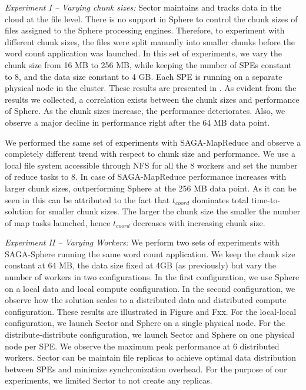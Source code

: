 \documentclass[3p,twocolumn]{elsarticle}
\begin{document}
{\it Experiment I -- Varying chunk sizes:} Sector maintains and tracks
data in the cloud at the file level. There is no support in Sphere to
control the chunk sizes of files assigned to the Sphere processing
engines. Therefore, to experiment with different chunk sizes, the
files were split manually into smaller chunks before the word count
application was launched. In this set of experiments, we vary the
chunk size from 16 MB to 256 MB, while keeping the number of SPEs
constant to 8, and the data size constant to 4 GB. Each SPE is running
on a separate physical node in the cluster. These results are
presented in . As evident from the results we collected, a
correlation exists between the chunk sizes and performance of Sphere.
As the chunk sizes increase, the performance deteriorates. Also, we
observe a major decline in performance right after the 64 MB data
point. 

We performed the same set of experiments with
SAGA-MapReduce and observe a completely different trend with respect
to chunk size and performance. We use a local file system accessible
through NFS for all the 8 workers and set the number of reduce tasks to 8.
In case of SAGA-MapReduce performance increases with larger chunk sizes,
outperforming Sphere at the 256 MB data point. As it can be seen in 
this can be attributed to the fact that $t_{coord}$ dominates total
time-to-solution for smaller chunk sizes. The larger the chunk size the
smaller the number of map tasks launched, hence $t_{coord}$ decreases with
increasing chunk size.


{\it Experiment II -- Varying Workers:} We perform two sets of
experiments with SAGA-Sphere running the same word count application.
We keep the chunk size constant at 64 MB, the
data size fixed at 4GB (as previously) but vary the number of
workers in two configurations. In the first configuration, we use Sphere 
on a local data and local compute configuration. In the second configuration, we 
observe how the solution scales to a distributed data and distributed compute
configuration. These results are illustrated in Figure  and F{xx}.  For
the local-local configuration, we launch Sector and Sphere on a single
physical node. For the distribute-distribute configuration, we launch
Sector and Sphere on one physical node per SPE.  We observe the
maximum peak performance at 6 distributed workers. Sector can be maintain 
file replicas to achieve optimal data distribution between SPEs and minimize
synchronization overhead. For the purpose of our experiments, we
limited Sector to not create any replicas.
\end{document}
